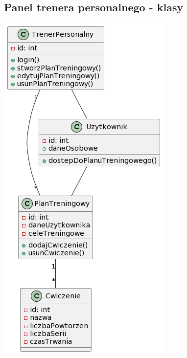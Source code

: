 \subsection{Panel trenera personalnego - klasy}\label{subsec:panel-trenera-personalnego-classes}

{\includegraphics{../diagrams/class/trener_personalny_klasy}}